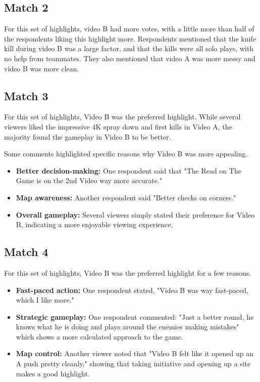 \subsection*{Match 2}
For this set of highlights, video B had more votes, with a little more than half of the respondents liking this highlight more. Respondents mentioned that the knife kill during video B was a large factor, and that the kills were all solo plays, with no help from teammates. They also mentioned that video A was more messy and video B was more clean.

\subsection*{Match 3}
For this set of highlights, Video B was the preferred highlight. While several viewers liked the impressive 4K spray down and first kills in Video A, the majority found the gameplay in Video B to be better.

Some comments highlighted specific reasons why Video B was more appealing.

\begin{itemize}
\item \textbf{Better decision-making:} One respondent said that "The Read on The Game is on the 2nd Video way more accurate."
\item \textbf{Map awareness:} Another respondent said "Better checks on corners."
\item \textbf{Overall gameplay:} Several viewers simply stated their preference for Video B, indicating a more enjoyable viewing experience.
\end{itemize}

\subsection*{Match 4}


For this set of highlights, Video B was the preferred highlight for a few reasons.

\begin{itemize}
\item \textbf{Fast-paced action:} One respondent stated, "Video B was way fast-paced, which I like more."
\item \textbf{Strategic gameplay:} One respondent commented: "Just a better round, he knows what he is doing and plays around the enemies making mistakes" which shows a more calculated approach to the game.
\item \textbf{Map control:} Another viewer noted that "Video B felt like it opened up an A push pretty cleanly," showing that taking initiative and opening up a site makes a good highlight.
\end{itemize}

